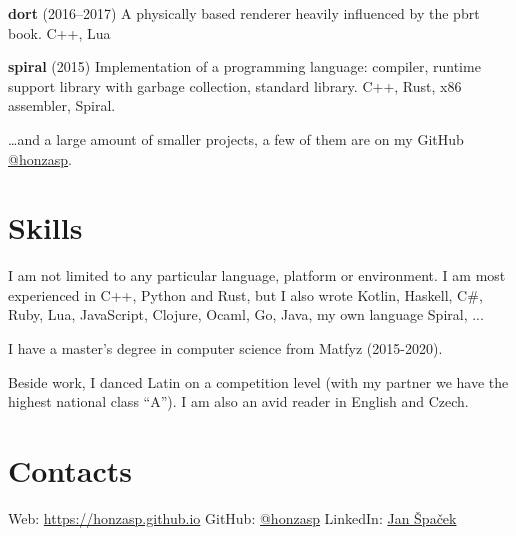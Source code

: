 \documentclass[10pt,a4paper]{article}
\begin{document}
\begin{multicols}{2}
\textbf{dort} (2016–2017)
  \newline A physically based renderer heavily influenced by the pbrt book.
  \newline C++, Lua

\textbf{spiral} (2015)
  \newline Implementation of a programming language: compiler, runtime support
  library with garbage collection, standard library.
  \newline C++, Rust, x86 assembler, Spiral.

\ldots{}and a large amount of smaller projects, a few of them are on my GitHub 
\href{https://github.com/honzasp}{@honzasp}.

\section*{Skills}

I am not limited to any particular language, platform or environment. I am most
experienced in C++, Python and Rust, but I also wrote
{\small Kotlin, Haskell, C\#,}
{\footnotesize Ruby, Lua, JavaScript,}
{\scriptsize Clojure, Ocaml, Go, Java, my own language Spiral, ...}

I have a master's degree in computer science from Matfyz (2015-2020).

Beside work, I danced Latin on a competition level (with my partner we have the
highest national class ``A''). I am also an avid reader in English and Czech.

\section*{Contacts}

Web: \url{https://honzasp.github.io}\newline
GitHub: \href{https://github.com/honzasp}{@honzasp}\newline
LinkedIn: \href{https://www.linkedin.com/in/jan-%C5%A1pa%C4%8Dek-3155b4136/}{Jan
Špaček}\newline

\end{multicols}
\end{document}
